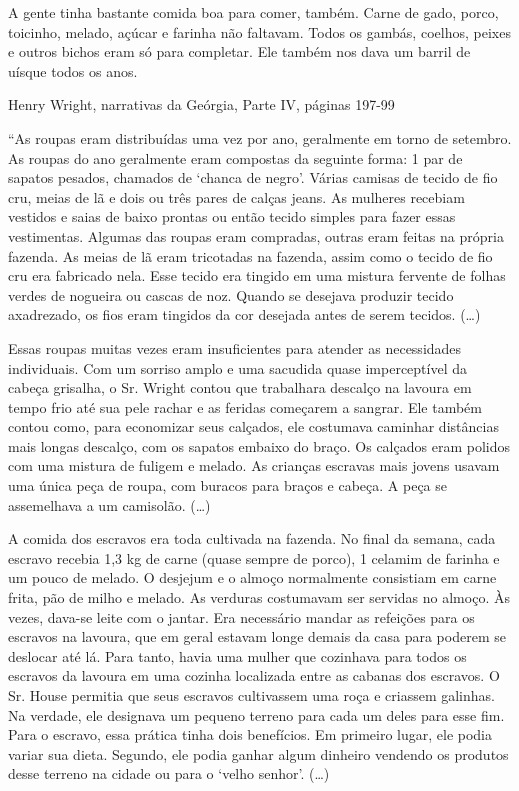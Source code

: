 A gente tinha bastante comida boa para comer, também. Carne de gado,
porco, toicinho, melado, açúcar e farinha não faltavam. Todos os gambás,
coelhos, peixes e outros bichos eram só para completar. Ele também nos
dava um barril de uísque todos os anos.

Henry Wright, narrativas da Geórgia, Parte IV, páginas 197-99

``As roupas eram distribuídas uma vez por ano, geralmente em torno de
setembro. As roupas do ano geralmente eram compostas da seguinte forma:
1 par de sapatos pesados, chamados de `chanca de negro'. Várias camisas
de tecido de fio cru, meias de lã e dois ou três pares de calças jeans.
As mulheres recebiam vestidos e saias de baixo prontas ou então tecido
simples para fazer essas vestimentas. Algumas das roupas eram compradas,
outras eram feitas na própria fazenda. As meias de lã eram tricotadas na
fazenda, assim como o tecido de fio cru era fabricado nela. Esse tecido
era tingido em uma mistura fervente de folhas verdes de nogueira ou
cascas de noz. Quando se desejava produzir tecido axadrezado, os fios
eram tingidos da cor desejada antes de serem tecidos. (\ldots{})

Essas roupas muitas vezes eram insuficientes para atender as
necessidades individuais. Com um sorriso amplo e uma sacudida quase
imperceptível da cabeça grisalha, o Sr. Wright contou que trabalhara
descalço na lavoura em tempo frio até sua pele rachar e as feridas
começarem a sangrar. Ele também contou como, para economizar seus
calçados, ele costumava caminhar distâncias mais longas descalço, com os
sapatos embaixo do braço. Os calçados eram polidos com uma mistura de
fuligem e melado. As crianças escravas mais jovens usavam uma única peça
de roupa, com buracos para braços e cabeça. A peça se assemelhava a um
camisolão. (\ldots{})

A comida dos escravos era toda cultivada na fazenda. No final da semana,
cada escravo recebia 1,3 kg de carne (quase sempre de porco), 1 celamim
de farinha e um pouco de melado. O desjejum e o almoço normalmente
consistiam em carne frita, pão de milho e melado. As verduras costumavam
ser servidas no almoço. Às vezes, dava-se leite com o jantar. Era
necessário mandar as refeições para os escravos na lavoura, que em geral
estavam longe demais da casa para poderem se deslocar até lá. Para
tanto, havia uma mulher que cozinhava para todos os escravos da lavoura
em uma cozinha localizada entre as cabanas dos escravos. O Sr. House
permitia que seus escravos cultivassem uma roça e criassem galinhas. Na
verdade, ele designava um pequeno terreno para cada um deles para esse
fim. Para o escravo, essa prática tinha dois benefícios. Em primeiro
lugar, ele podia variar sua dieta. Segundo, ele podia ganhar algum
dinheiro vendendo os produtos desse terreno na cidade ou para o `velho
senhor'. (\ldots{})

